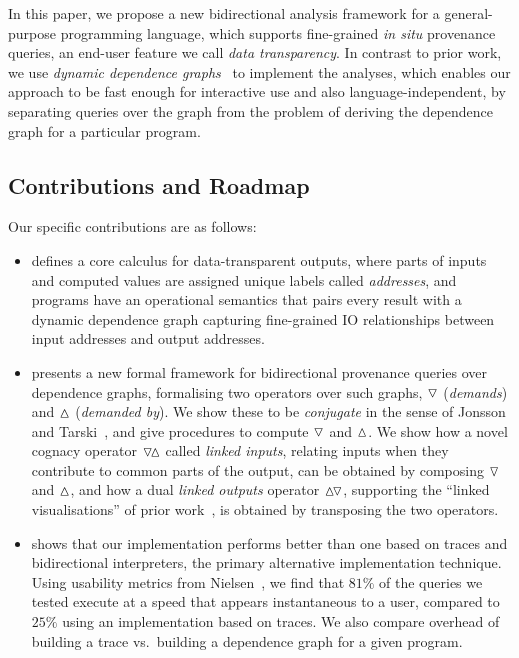 In this paper, we propose a new bidirectional analysis framework for a general-purpose programming language,
which supports fine-grained \emph{in situ} provenance queries, an end-user feature we call \emph{data
transparency}. In contrast to prior work, we use \emph{dynamic dependence graphs}~\cite{ferrante87,agrawal90}
to implement the analyses, which enables our approach to be fast enough for interactive use and also
language-independent, by separating queries over the graph from the problem of deriving the dependence graph
for a particular program.

\subsection{Contributions and Roadmap}
\label{sec:introduction:contributions}

Our specific contributions are as follows:

\begin{itemize}[leftmargin=*]
   \item {} defines a core calculus for data-transparent outputs, where parts of inputs and
      computed values are assigned unique labels called \emph{addresses}, and programs have an operational
      semantics that pairs every result with a dynamic dependence graph capturing fine-grained IO
      relationships between input addresses and output addresses.

   \item {} presents a new formal framework for bidirectional provenance queries over
      dependence graphs, formalising two operators over such graphs, $\triangledown$ (\emph{demands}) and
      $\demandedByR$ (\emph{demanded by}). We show these to be \emph{conjugate} in the sense of Jonsson and
      Tarski~\cite{jonsson51}, and give procedures to compute $\triangledown$ and $\demandedByR$. We show how a
      novel cognacy operator $\relInputR$ called \emph{linked inputs}, relating inputs when they contribute to
      common parts of the output, can be obtained by composing $\triangledown$ and $\demandedByR$, and how a dual
      \emph{linked outputs} operator $\relOutputR$, supporting the ``linked visualisations'' of prior
      work~\cite{psallidas18b,perera22}, is obtained by transposing the two operators.

   \item {} shows that our implementation performs better than one based on traces and
      bidirectional interpreters, the primary alternative implementation technique. Using usability metrics
      from Nielsen~\cite{nielsen93}, we find that $81\%$ of the queries we tested execute at a speed that
      appears instantaneous to a user, compared to $25\%$ using an implementation based on traces. We also
      compare overhead of building a trace vs.~building a dependence graph for a given program.
\end{itemize}

